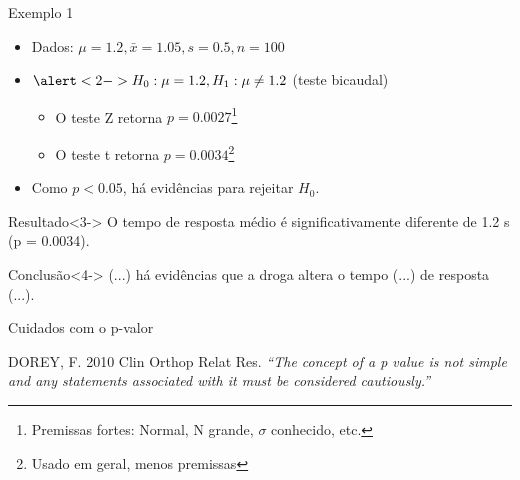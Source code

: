 \documentclass{beamer}
\begin{document}
\begin{frame}{Exemplo 1}
    \begin{itemize}
      \scriptsize
    \item Dados: $\mu = 1.2, \bar{x} = 1.05, s = 0.5, n=100$
    \item $\alert<2->{H_0: \mu = 1.2}, H_1: \mu \ne 1.2$ (teste bicaudal)
      \begin{itemize}
        \scriptsize
      \item O teste Z retorna $p = 0.0027$\footnote{Premissas fortes: Normal, N grande, $\sigma$ conhecido, etc.}
      \item O teste t retorna $p = 0.0034$\footnote{Usado em geral, menos premissas}
      \end{itemize}
    \item<2-> Como $p < 0.05$, há evidências para rejeitar \alert<2->{$H_0$}.
    \end{itemize}
  \begin{exampleblock}{Resultado}<3->
    \small
    O tempo de resposta médio é \alert{significativamente} diferente de 1.2 s ({\footnotesize p = 0.0034}).
  \end{exampleblock}
  \begin{exampleblock}{Conclusão}<4->
    \small
    (...) há evidências que a droga altera o tempo (...)  de resposta (...).
  \end{exampleblock}

\end{frame}

\begin{frame}{Cuidados com o p-valor}
    \begin{block}{{\small DOREY, F. 2010 Clin Orthop Relat Res.}}
    \small
    {\em ``The concept of a p value is not simple and any statements
    associated with it must be considered cautiously.''}
  \end{block}
\end{frame}
\end{document}
